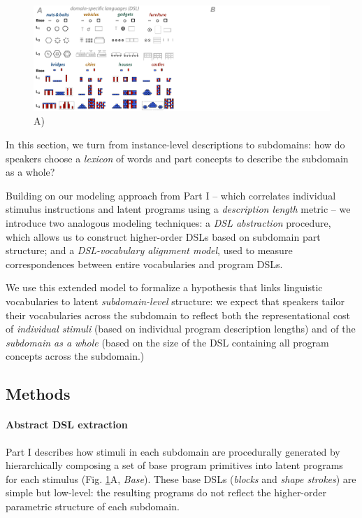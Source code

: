 \documentclass[10pt,letterpaper]{article}
\begin{document}
\begin{figure}[!ht]
  \begin{center}
  \includegraphics[width=0.98\linewidth]{figures/lax_libraries.pdf}
  \caption{A) }
  \label{fig:library_gallery}
  \end{center}
\end{figure}
In this section, we turn from instance-level descriptions to subdomains: how do speakers choose a \textit{lexicon} of words and part concepts to describe the subdomain as a whole?

Building on our modeling approach from Part I -- which correlates individual stimulus instructions and latent programs using a \textit{description length} metric -- we introduce two analogous modeling techniques: a \textit{DSL abstraction} procedure, which allows us to construct higher-order DSLs based on subdomain part structure; and a \textit{DSL-vocabulary alignment model}, used to measure correspondences between entire vocabularies and program DSLs.

We use this extended model to formalize a hypothesis that links linguistic vocabularies to latent \textit{subdomain-level} structure: we expect that speakers tailor their vocabularies across the subdomain to reflect both the representational cost of \textit{individual stimuli} (based on individual program description lengths) and of the \textit{subdomain as a whole} (based on the size of the DSL containing all program concepts across the subdomain.)

\subsection{Methods}
\paragraph{Abstract DSL extraction} 
Part I describes how stimuli in each subdomain are procedurally generated by hierarchically composing a set of base program primitives into latent programs for each stimulus (Fig. \ref{fig:library_gallery}A, \textit{Base}). These base DSLs (\textit{blocks} and \textit{shape strokes}) are simple but low-level: the resulting programs do not reflect the higher-order parametric structure of each subdomain.
\end{document}
